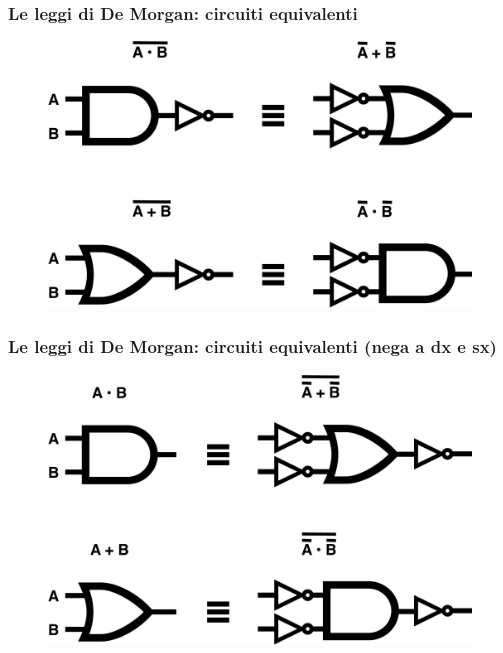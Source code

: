 \begin{frame}
	\frametitle{Le leggi di De Morgan: circuiti equivalenti}

	\begin{figure}[!htbp]
		\centering 
		\includegraphics[width=0.8\linewidth]{images/2_le_architetture/demorgan_1.pdf}
	\end{figure}
	
\end{frame}

\begin{frame}
	\frametitle{Le leggi di De Morgan: circuiti equivalenti (nega a dx e sx)}
	
	\begin{figure}[!htbp]
		\centering 
		\includegraphics[width=0.8\linewidth]{images/2_le_architetture/demorgan_2.pdf}
	\end{figure}
\end{frame}


